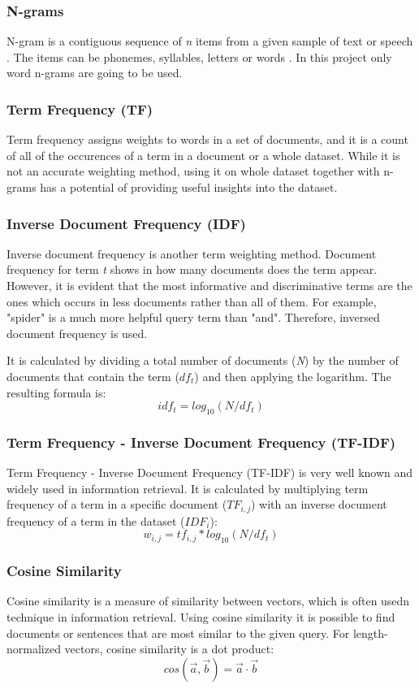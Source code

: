 \subsubsection{N-grams}
N-gram is a contiguous sequence of \textit{n} items from a given sample of text or speech \cite{ngramwiki}. The items can be phonemes, syllables, letters or words \cite{ngramwiki}. In this project only word n-grams are going to be used.

\subsubsection{Term Frequency (TF)}
Term frequency assigns weights to words in a set of documents, and it is a count of all of the occurences of a term in a document or a whole dataset. While it is not an accurate weighting method, using it on whole dataset together with n-grams has a potential of providing useful insights into the dataset.
\subsubsection{Inverse Document Frequency (IDF)}
Inverse document frequency is another term weighting method. Document frequency for term \textit{t} shows in how many documents does the term appear. However, it is evident that the most informative and discriminative terms are the ones which occurs in less documents rather than all of them. For example, "spider" is a much more helpful query term than "and". Therefore, inversed document frequency is used.

It is calculated by dividing a total number of documents (\textit{N}) by the number of documents that contain the term (\textit{$df_{t}$}) and then applying the logarithm. The resulting formula is:
\[ idf_{t} = log_{10}(N/df_{t}) \]

\subsubsection{Term Frequency - Inverse Document Frequency (TF-IDF)}
Term Frequency - Inverse Document Frequency (TF-IDF) is very well known and widely used in information retrieval. It is calculated by multiplying term frequency of a term in a specific document ($TF_{i, j}$) with an inverse document frequency of a term in the dataset ($IDF_{i}$):
\[ w_{i,j} = tf_{i,j} * log_{10}(N/df_{t}) \]

\subsubsection{Cosine Similarity}
Cosine similarity is a measure of similarity between vectors, which is often usedn technique in information retrieval. Using cosine similarity it is possible to find documents or sentences that are most similar to the given query. For length-normalized vectors, cosine similarity is a dot product:
\[cos(\vec{a},\vec{b})=\vec{a} \cdot \vec{b}\]
